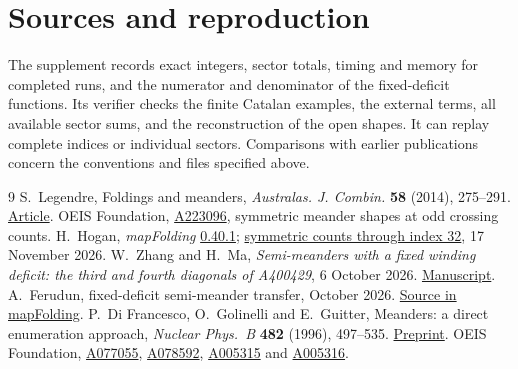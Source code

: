 \section*{Sources and reproduction}
The supplement records exact integers, sector totals, timing and memory for completed runs, and the numerator and denominator of the fixed-deficit functions. Its verifier checks the finite Catalan examples, the external terms, all available sector sums, and the reconstruction of the open shapes. It can replay complete indices or individual sectors. Comparisons with earlier publications concern the conventions and files specified above.
\begin{thebibliography}{9}\small
{} S.~Legendre, Foldings and meanders, \emph{Australas. J. Combin.} \textbf{58} (2014), 275--291. \href{https://ajc.maths.uq.edu.au/pdf/58/ajc_v58_p275.pdf}{Article}.
 OEIS Foundation, \href{https://oeis.org/A223096}{A223096}, symmetric meander shapes at odd crossing counts.
 H.~Hogan, \emph{mapFolding} \href{https://pypi.org/project/mapFolding/0.40.1/}{0.40.1}; \href{https://github.com/hunterhogan/mapFolding/blob/1862930c2f0bfe5a38ae8cd299e6b85eaa1dc632/mapFolding/oeis/terms/files/A223/b223096.txt}{symmetric counts through index 32}, 17 November 2026.
 W.~Zhang and H.~Ma, \emph{Semi-meanders with a fixed winding deficit: the third and fourth diagonals of A400429}, 6 October 2026. \href{https://oeis.org/A400429/a400429.pdf}{Manuscript}.
 A.~Ferudun, fixed-deficit semi-meander transfer, October 2026. \href{https://github.com/hunterhogan/mapFolding/blob/1862930c2f0bfe5a38ae8cd299e6b85eaa1dc632/research/matrixMeanders/fixed_deficit_semimeanders.py}{Source in mapFolding}.
 P.~Di Francesco, O.~Golinelli and E.~Guitter, Meanders: a direct enumeration approach, \emph{Nuclear Phys.~B} \textbf{482} (1996), 497--535. \href{https://arxiv.org/abs/hep-th/9607039}{Preprint}.
 OEIS Foundation, \href{https://oeis.org/A077055}{A077055}, \href{https://oeis.org/A078592}{A078592}, \href{https://oeis.org/A005315}{A005315} and \href{https://oeis.org/A005316}{A005316}.
\end{thebibliography}

